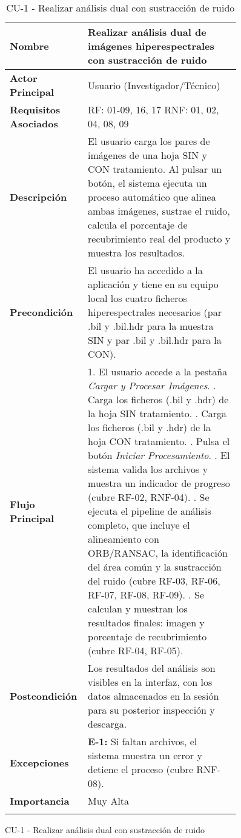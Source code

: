 \begin{figure}[H]
\begin{longtable}{p{0.25\linewidth} p{0.65\linewidth}}
    \textbf{Nombre} & Realizar análisis dual de imágenes hiperespectrales con sustracción de ruido \\
    \midrule
    \textbf{Actor Principal} & Usuario (Investigador/Técnico) \\
    \midrule
    \textbf{Requisitos Asociados} & RF: 01-09, 16, 17 \newline RNF: 01, 02, 04, 08, 09 \\
    \midrule
    \textbf{Descripción} & El usuario carga los pares de imágenes de una hoja SIN y CON tratamiento. Al pulsar un botón, el sistema ejecuta un proceso automático que alinea ambas imágenes, sustrae el ruido, calcula el porcentaje de recubrimiento real del producto y muestra los resultados. \\
    \midrule
    \textbf{Precondición} & El usuario ha accedido a la aplicación y tiene en su equipo local los cuatro ficheros hiperespectrales necesarios (par .bil y .bil.hdr para la muestra SIN y par .bil y .bil.hdr para la CON). \\
    \midrule
    \textbf{Flujo Principal} & 
        1. El usuario accede a la pestaña   \textit{Cargar y Procesar Imágenes}. \newline
        2. Carga los ficheros (.bil y .hdr) de la hoja SIN tratamiento. \newline
        3. Carga los ficheros (.bil y .hdr) de la hoja CON tratamiento. \newline
        4. Pulsa el botón \textit{Iniciar Procesamiento}. \newline
        5. El sistema valida los archivos y muestra un indicador de progreso (cubre RF-02, RNF-04). \newline
        6. Se ejecuta el pipeline de análisis completo, que incluye el alineamiento con ORB/RANSAC, la identificación del área común y la sustracción del ruido (cubre RF-03, RF-06, RF-07, RF-08, RF-09). \newline
        7. Se calculan y muestran los resultados finales: imagen y porcentaje de recubrimiento (cubre RF-04, RF-05). \\
    \midrule
    \textbf{Postcondición} & Los resultados del análisis son visibles en la interfaz, con los datos almacenados en la sesión para su posterior inspección y descarga. \\
    \midrule
    \textbf{Excepciones} & \textbf{E-1:} Si faltan archivos, el sistema muestra un error y detiene el proceso (cubre RNF-08). \\
    \midrule
    \textbf{Importancia} & Muy Alta \\
    \caption{CU-1 - Realizar análisis dual con sustracción de ruido} \label{tab:cu1} \\
\end{longtable}
\end{figure}


